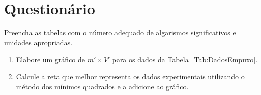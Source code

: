 \cleardoublepage


\vspace{15mm}

\begin{fullwidth}
\noindent{}
\vspace{5mm}

\noindent{}

\noindent{}

\noindent{}

\noindent{}

\noindent{}
\end{fullwidth}

\vspace{5mm}

\section{Questionário}

\begin{question}[type={exam}]
Preencha as tabelas com o número adequado de algarismos significativos e unidades apropriadas. 
\end{question}

\begin{question}[type={exam}]
\begin{enumerate}[label=\roman*.]
    \item Elabore um gráfico de $m' \times V'$ para os dados da Tabela~\ref{Tab:DadosEmpuxo}.
    \item Calcule a reta que melhor representa os dados experimentais utilizando o método dos mínimos quadrados e a adicione ao gráfico.
\end{enumerate}
\end{question}

